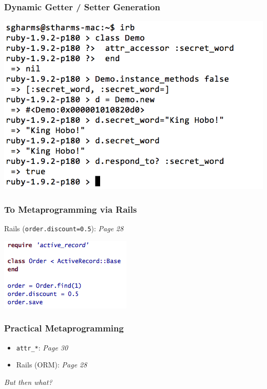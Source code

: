 \documentclass[slidestop,compress,mathserif]{beamer}
\begin{document}
\begin{frame}
	\frametitle{Dynamic Getter / Setter Generation}
	\includegraphics[scale=0.45]{img/attr_demo_1.png}	
\end{frame}

\begin{frame} \frametitle{To Metaprogramming via Rails}
	Rails (\texttt{order.discount=0.5}):  \emph{Page 28}
	\begin{center}
		\includegraphics[scale=0.55]{img/awdwr_mp.png}	
	\end{center}
\end{frame}

\begin{frame}
	\frametitle{Practical Metaprogramming}
	\begin{itemize} 
		\item \texttt{attr\_*}:  \emph{Page 30}
		\item Rails (ORM):  \emph{Page 28}
	\end{itemize}      
	\pause
	\vskip 0.5cm
	\emph{But then what?}
\end{frame}
\end{document}
